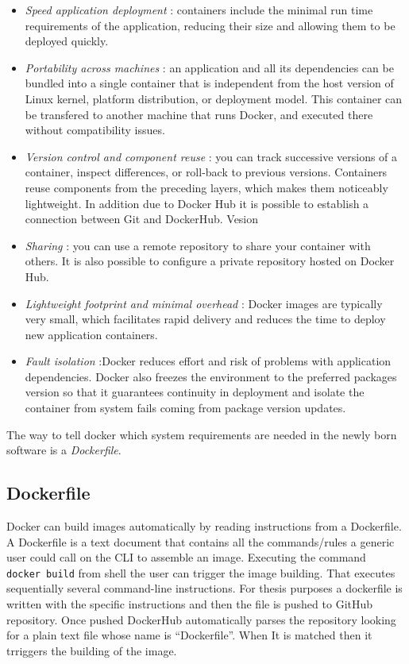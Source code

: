 \documentclass[
  12pt,
  a4paper,
  oneside]{book}
\providecommand{\tightlist}{%
  \setlength{\itemsep}{0pt}\setlength{\parskip}{0pt}}
\begin{document}
\begin{itemize}
\tightlist
\item
  \emph{Speed application deployment} : containers include the minimal run time requirements of the application, reducing their size and allowing them to be deployed quickly.
\item
  \emph{Portability across machines} : an application and all its dependencies can be bundled into a single container that is independent from the host version of Linux kernel, platform distribution, or deployment model. This container can be transfered to another machine that runs Docker, and executed there without compatibility issues.
\item
  \emph{Version control and component reuse} : you can track successive versions of a container, inspect differences, or roll-back to previous versions. Containers reuse components from the preceding layers, which makes them noticeably lightweight. In addition due to Docker Hub it is possible to establish a connection between Git and DockerHub. Vesion
\item
  \emph{Sharing} : you can use a remote repository to share your container with others. It is also possible to configure a private repository hosted on Docker Hub.
\item
  \emph{Lightweight footprint and minimal overhead} : Docker images are typically very small, which facilitates rapid delivery and reduces the time to deploy new application containers.
\item
  \emph{Fault isolation} :Docker reduces effort and risk of problems with application dependencies. Docker also freezes the environment to the preferred packages version so that it guarantees continuity in deployment and isolate the container from system fails coming from package version updates.
\end{itemize}

The way to tell docker which system requirements are needed in the newly born software is a \emph{Dockerfile}.

\hypertarget{dockerfile}{%
\subsection{Dockerfile}\label{dockerfile}}

Docker can build images automatically by reading instructions from a Dockerfile. A Dockerfile is a text document that contains all the commands/rules a generic user could call on the CLI to assemble an image. Executing the command \texttt{docker\ build} from shell the user can trigger the image building. That executes sequentially several command-line instructions. For thesis purposes a dockerfile is written with the specific instructions and then the file is pushed to GitHub repository. Once pushed DockerHub automatically parses the repository looking for a plain text file whose name is ``Dockerfile''. When It is matched then it trriggers the building of the image.
\end{document}
